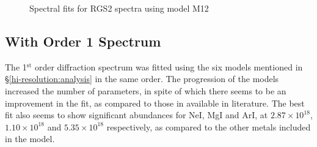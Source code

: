 			\begin{figure}[h!]
				\centering
				 \hfill
				\caption{Spectral fits for RGS2 spectra using model M12}
				\label{xmm:rgs2-m12}
			\end{figure}
			
		\subsection{With Order 1 Spectrum} \label{hi-resolution:analysis:order-1}
			The 1$^{\mathrm{st}}$ order diffraction spectrum was fitted using the six models mentioned in \S\ref{hi-resolution:analysis} in the same order. The progression of the models increased the number of parameters, in spite of which there seems to be an improvement in the fit, as compared to those in available in literature. The best fit also seems to show significant abundances for NeI, MgI and ArI, at $2.87\times 10^{18}$, $1.10\times 10^{18}$ and $5.35\times 10^{18}$ respectively, as compared to the other metals included in the model.
			
